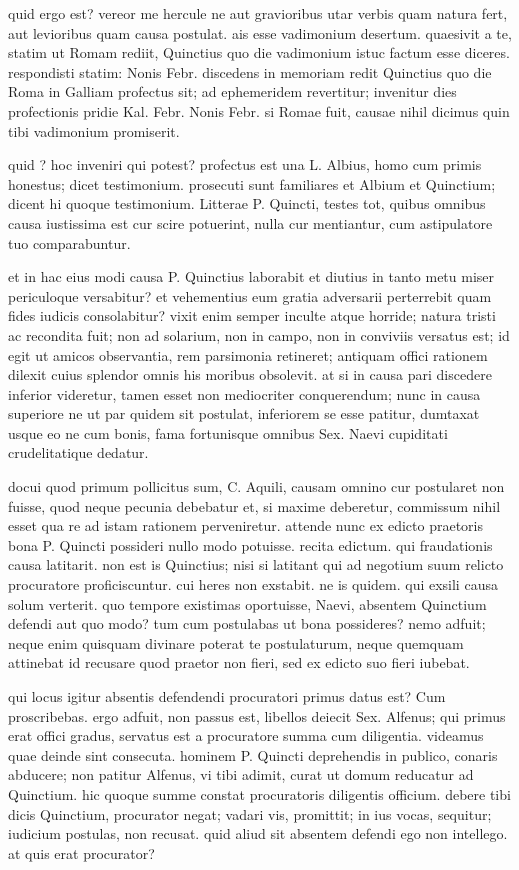  quid ergo est? vereor me hercule ne aut gravioribus utar verbis quam natura fert, aut levioribus quam causa postulat. ais esse vadimonium desertum. quaesivit a te, statim ut Romam rediit, Quinctius quo die vadimonium istuc factum esse diceres. respondisti statim: Nonis Febr. discedens in memoriam redit Quinctius quo die Roma in Galliam profectus sit; ad ephemeridem revertitur; invenitur dies profectionis pridie Kal. Febr. Nonis Febr. si Romae fuit, causae nihil dicimus quin tibi vadimonium promiserit.

 quid ? hoc inveniri qui potest? profectus est una L. Albius, homo cum primis honestus; dicet testimonium. prosecuti sunt familiares et Albium et Quinctium; dicent hi quoque testimonium. Litterae P. Quincti, testes tot, quibus omnibus causa iustissima est cur scire potuerint, nulla cur mentiantur, cum astipulatore tuo comparabuntur.

 et in hac eius modi causa P. Quinctius laborabit et diutius in tanto metu miser periculoque versabitur? et vehementius eum gratia adversarii perterrebit quam fides iudicis consolabitur? vixit enim semper inculte atque horride; natura tristi ac recondita fuit; non ad solarium, non in campo, non in conviviis versatus est; id egit ut amicos observantia, rem parsimonia retineret; antiquam offici rationem dilexit cuius splendor omnis his moribus obsolevit. at si in causa pari discedere inferior videretur, tamen esset non mediocriter conquerendum; nunc in causa superiore ne ut par quidem sit postulat, inferiorem se esse patitur, dumtaxat usque eo ne cum bonis, fama fortunisque omnibus Sex. Naevi cupiditati crudelitatique dedatur.

 docui quod primum pollicitus sum, C. Aquili, causam omnino cur postularet non fuisse, quod neque pecunia debebatur et, si maxime deberetur, commissum nihil esset qua re ad istam rationem perveniretur. attende nunc ex edicto praetoris bona P. Quincti possideri nullo modo potuisse. recita edictum. qui fraudationis causa latitarit. non est is Quinctius; nisi si latitant qui ad negotium suum relicto procuratore proficiscuntur. cui heres non exstabit. ne is quidem. qui exsili causa solum verterit. quo tempore existimas oportuisse, Naevi, absentem Quinctium defendi aut quo modo? tum cum postulabas ut bona possideres? nemo adfuit; neque enim quisquam divinare poterat te postulaturum, neque quemquam attinebat id recusare quod praetor non fieri, sed ex edicto suo fieri iubebat.

 qui locus igitur absentis defendendi procuratori primus datus est? Cum proscribebas. ergo adfuit, non passus est, libellos deiecit Sex. Alfenus; qui primus erat offici gradus, servatus est a procuratore summa cum diligentia. videamus quae deinde sint consecuta. hominem P. Quincti deprehendis in publico, conaris abducere; non patitur Alfenus, vi tibi adimit, curat ut domum reducatur ad Quinctium. hic quoque summe constat procuratoris diligentis officium. debere tibi dicis Quinctium, procurator negat; vadari vis, promittit; in ius vocas, sequitur; iudicium postulas, non recusat. quid aliud sit absentem defendi ego non intellego. at quis erat procurator?

